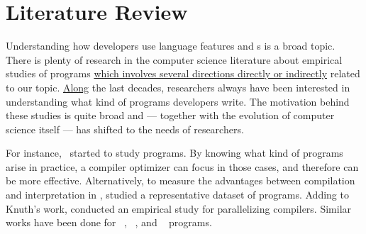 





\chapter{Literature Review}
\label{cha:literature-review}

Understanding how developers use language features and \api{}s is a broad topic.
There is plenty of research in the computer science literature about empirical studies of programs
\underline{which involves several directions directly or indirectly} related to our topic.
\underline{Along} the last decades,
researchers always have been interested in understanding what kind of programs developers write.
The motivation behind these studies is quite broad and --- together with the evolution of computer science itself --- has
shifted to the needs of researchers.

For instance,~\cite{knuthEmpiricalStudyFORTRAN1971} started to study \fortran{} programs.
By knowing what kind of programs arise in practice,
a compiler optimizer can focus in those cases,
and therefore can be more effective.
Alternatively, to measure the advantages between compilation and interpretation in \basic{},
\cite{hammondBASICEvaluationProcessing1977} studied a representative dataset of programs.
Adding to Knuth's work,
\cite{shenEmpiricalStudyFortran1990} conducted an empirical study for parallelizing compilers.
Similar works have been done for \cobol{}~\cite{salvadoriStaticProfileCOBOL1975,chevanceStaticProfileDynamic1978}, \pascal{}~\cite{cookContextualAnalysisPascal1982}, and \apl{}~\cite{saalPropertiesAPLPrograms1975,saalEmpiricalStudyAPL1977} programs. 

